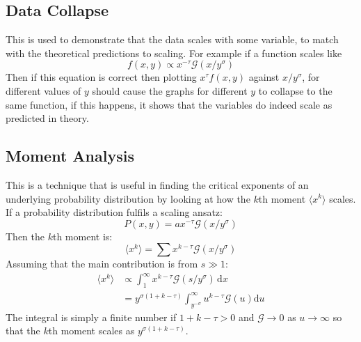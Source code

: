 \documentclass[twoside]{article}
\begin{document}
\subsection{Data Collapse}
This is used to demonstrate that the data scales with some variable, to match with the theoretical predictions to scaling. For example if a function scales like
\[
f(x,y) \propto x^{-\tau} \mathcal{G} ( x / y^{\sigma} )
\]
Then if this equation is correct then plotting $x^{\tau} f(x,y)$ against $x/y^{\sigma}$, for different values of $y$ should cause the graphs for different $y$ to collapse to the same function, if this happens, it shows that the variables do indeed scale as predicted in theory.

\subsection{Moment Analysis}
This is a technique that is useful in finding the critical exponents of an underlying probability distribution by looking at how the $k$th moment $\langle x^k \rangle $ scales. If a probability distribution fulfils a scaling ansatz:
\[
P(x,y) = a x^{-\tau} \mathcal{G} (x/ y^{\sigma} )
\]
Then the $k$th moment is:
\[
\langle x^k \rangle = \sum x^{k-\tau} \mathcal{G} (x/ y^{\sigma} )
\]
Assuming that the main contribution is from $s \gg 1$:
\begin{align*}
\langle x^k \rangle &\propto \int_{1}^{\infty} x^{k-\tau} \mathcal{G} (s/y^{\sigma} ) \, \mathrm{d} x \\
& = y^{\sigma(1+k-\tau)} \int_{y^{-\sigma}}^{\infty} u^{k-\tau} \mathcal{G}(u) \mathrm{d} u
\end{align*}
The integral is simply a finite number if $1+k-\tau>0$ and $\mathcal{G} \to 0$ as $u \to \infty$ so that the $k$th moment scales as $y^{\sigma(1+k-\tau)}$.
\end{document}

